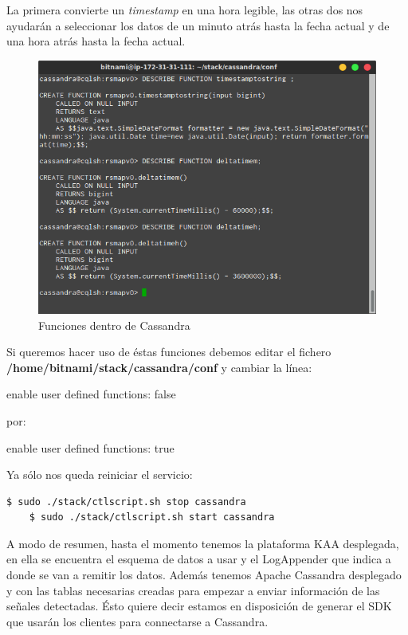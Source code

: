 \bigskip

La primera convierte un \textit{timestamp} en una hora legible, las otras dos nos ayudarán a seleccionar los datos de un minuto atrás hasta la fecha actual y de una hora atrás hasta la fecha actual.

\begin{figure}[!ht]
  \begin{center}
    \includegraphics[scale=0.65]{../images/cassandra/5.png}
		\caption{Funciones dentro de Cassandra}
    \label{fig:kaa}
	\end{center}
\end{figure}

\newpage

Si queremos hacer uso de éstas funciones debemos editar el fichero \textbf{/home/bitnami/stack/cassandra/conf} y cambiar la línea:

enable user defined functions: false

por:

enable user defined functions: true

\bigskip

Ya sólo nos queda reiniciar el servicio:

\begin{lstlisting}[language=bash,caption={Reiniciando Cassandra},label={lst:rcas}]
	$ sudo ./stack/ctlscript.sh stop cassandra
	$ sudo ./stack/ctlscript.sh start cassandra
\end{lstlisting}

A modo de resumen, hasta el momento tenemos la plataforma KAA desplegada, en ella se encuentra el esquema de datos a usar y el LogAppender que indica a donde se van a remitir los datos. Además tenemos Apache Cassandra desplegado y con las tablas necesarias creadas para empezar a enviar información de las señales detectadas. Ésto quiere decir estamos en disposición de generar el SDK que usarán los clientes para connectarse a Cassandra.

